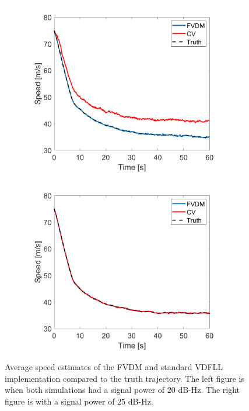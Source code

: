 \begin{figure}[!ht]
    \begin{subfigure}{.45\textwidth}
        \centering
        \includegraphics[width=1\linewidth]{Figures/dynamic/20/SPEED.png}
    \end{subfigure}
    \begin{subfigure}{.45\textwidth}
        \centering
        \includegraphics[width=1\linewidth]{Figures/dynamic/25/SPEED.png}
    \end{subfigure}
    \caption{Average speed estimates of the FVDM and standard VDFLL implementation compared to the truth trajectory. The left figure is when both simulations had a signal power of \(20\) dB-Hz. The right figure is with a signal power of \(25\) dB-Hz.}\label{fig:Speed2}
\end{figure}

